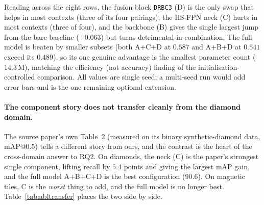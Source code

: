 \documentclass[11pt,a4paper]{article}
\begin{document}
Reading across the eight rows, the fusion block \texttt{DRBC3} (D) is the only swap that helps in most
contexts (three of its four pairings), the HS-FPN neck (C) hurts in most contexts (three of four), and
the backbone (B) gives the single largest jump from the bare baseline ($+0.063$) but turns detrimental
in combination. The full model is beaten by smaller subsets (both A+C+D at $0.587$ and A+B+D at $0.541$
exceed its $0.489$), so its one genuine advantage is the smallest parameter count ($14.3$\,M), matching
the efficiency (not accuracy) finding of the initialisation-controlled comparison. All values are single
seed; a multi-seed run would add error bars and is the one remaining optional extension.

\paragraph{The component story does not transfer cleanly from the diamond domain.}
The source paper's own Table~2 (measured on its binary synthetic-diamond data, mAP@0.5) tells a
different story from ours, and the contrast is the heart of the cross-domain answer to RQ2. On diamonds,
the neck (C) is the paper's strongest single component, lifting recall by $5.4$ points and giving the
largest mAP gain, and the full model A+B+C+D is the best configuration ($90.6$). On magnetic tiles, C is
the \emph{worst} thing to add, and the full model is no longer best. Table~\ref{tab:abltransfer}
places the two side by side.
\end{document}
